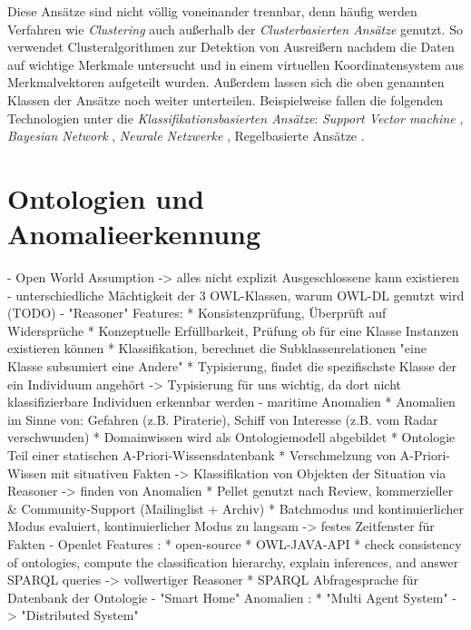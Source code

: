 Diese Ansätze sind nicht völlig voneinander trennbar, denn häufig werden Verfahren wie \textit{Clustering} auch außerhalb der \textit{Clusterbasierten Ansätze} genutzt. So verwendet \citet{eskin2002geometric} Clusteralgorithmen zur Detektion von Ausreißern nachdem die Daten auf wichtige Merkmale untersucht und in einem virtuellen Koordinatensystem aus Merkmalvektoren aufgeteilt wurden. Außerdem lassen sich die oben genannten Klassen der Ansätze noch weiter unterteilen. Beispielweise fallen die folgenden Technologien unter die \textit{Klassifikationsbasierten Ansätze}: \textit{Support Vector machine} \cite{noble2006support}, \textit{Bayesian Network} \cite{kruegel2003bayesian}, \textit{Neurale Netzwerke} \cite{zhang2001hide}, Regelbasierte Ansätze \cite{yang2013rule}.

\section{Ontologien und Anomalieerkennung}
- Open World Assumption -> alles nicht explizit Ausgeschlossene kann existieren
- unterschiedliche Mächtigkeit der 3 OWL-Klassen, warum OWL-DL genutzt wird (TODO)
- "Reasoner" Features: \cite{roy2010exploitation}
	* Konsistenzprüfung, Überprüft auf Widersprüche
	* Konzeptuelle Erfüllbarkeit, Prüfung ob für eine Klasse Instanzen existieren können
	* Klassifikation, berechnet die Subklassenrelationen "eine Klasse subsumiert eine Andere"
	* Typisierung, findet die spezifischste Klasse der ein Individuum angehört
-> Typisierung für uns wichtig, da dort nicht klassifizierbare Individuen erkennbar werden
- maritime Anomalien \cite{roy2010exploitation}
	* Anomalien im Sinne von: Gefahren (z.B. Piraterie), Schiff von Interesse (z.B. vom Radar verschwunden)
	* Domainwissen wird als Ontologiemodell abgebildet
	* Ontologie Teil einer statischen A-Priori-Wissensdatenbank
	* Verschmelzung von A-Priori-Wissen mit situativen Fakten -> Klassifikation von Objekten der Situation via Reasoner -> finden von Anomalien
	* Pellet genutzt nach Review, kommerzieller & Community-Support (Mailinglist + Archiv)
	* Batchmodus und kontinuierlicher Modus evaluiert, kontinuierlicher Modus zu langsam -> festes Zeitfenster für Fakten
- Openlet Features \cite{openlett}:
	* open-source
	* OWL-JAVA-API
	* check consistency of ontologies, compute the classification hierarchy, explain inferences, and answer SPARQL queries -> vollwertiger Reasoner
	* SPARQL Abfragesprache für Datenbank der Ontologie
- "Smart Home" Anomalien \cite{pardo2016framework}:
	* "Multi Agent System" -> "Distributed System"
